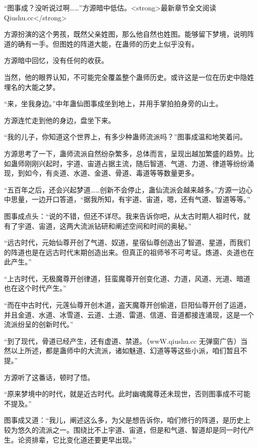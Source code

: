 
\begin{this_body}

“图事成？没听说过啊……”方源暗中低估。<strong>最新章节全文阅读Qiushu.cc</strong>

方源扮演的这个男孩，既然父亲姓图，那么他自然也姓图。能够留下梦境，说明阵道的确有一手。但图姓的阵道大能，在蛊师的历史上似乎没有。

方源暗中回忆，没有任何的收获。

当然，他的眼界认知，不可能完全覆盖整个蛊师历史。或许这是一位在历史中隐姓埋名的大能之梦。

“来，坐我身边。”中年蛊仙图事成坐到地上，并用手掌拍拍身旁的山土。

方源连忙走到他的身边，盘坐下来。

“我的儿子，你知道这个世界上，有多少种蛊师流派吗？”图事成温和地笑着问。

方源思考了一下，蛊师流派自然纷杂繁多，总体而言，呈现出越加繁盛的趋势。比如蛊师刚刚兴起时，宇道、宙道占据主流，随后智道、气道、力道、律道等纷纷涌现，到如今，有炎道、水道、金道、骨道、毒道等等数量更多。

“五百年之后，还会兴起梦道……创新不会停止，蛊仙流派会越来越多。”方源一边心中思量，一边开口答道，“据我所知，有宇道、宙道，嗯，还有气道、智道等等。”

图事成点头：“说的不错，但还不详尽。我来告诉你吧，从太古时期人祖时代，就有了宇道、宙道，这两大流派钻研和阐述空间和时间的奥秘。”

“远古时代，元始仙尊开创了气道、奴道，星宿仙尊创造出了智道、星道，而我们的阵道也是在远古时代末期创造出来。但真正的祖师爷不可考证。炼道、炎道也在此产生。”

“上古时代，无极魔尊开创律道，狂蛮魔尊开创变化道、力道，风道、光道、暗道也在这个时代产生。”

“而在中古时代，元莲仙尊开创木道，盗天魔尊开创偷道，巨阳仙尊开创了运道，并且金道、水道、冰雪道、云道、土道、雷道、信道、音道都接连涌现，这是一个流派纷呈的创新时代。”

“到了现代，骨道已经产生，还有虚道、禁道。（wwW.qiushu.cc 无弹窗广告）当然以上所述，都是蛊师中的大流派，诸如魅道、幻道等等这些小派，咱们暂且不提。”

方源听了这番话，顿时了悟。

“原来梦境中的时代，就是近古时代。此时幽魂魔尊还未现世，否则图事成不可能不提及。”

图事成又道：“我儿，阐述这么多，为父是想告诉你，咱们修行的阵道，是历史上较为悠久的流派之一。围绕比不上宇道、宙道，但是和气道、智道却是同一时代产生。论资排辈，它比变化道还要更早出现。”


\end{this_body}
